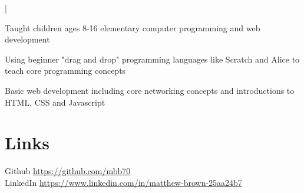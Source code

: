 \documentclass[]{deedy-resume-openfont}
\begin{document}
|
\begin{tightemize}
\item Taught children ages 8-16 elementary computer programming and web development
\item Using beginner "drag and drop" programming languages like Scratch and Alice to teach core programming concepts
\item Basic web development including core networking concepts and introductions to HTML, CSS and Javascript
\end{tightemize}



\section{Links}
Github \href{https://github.com/mbb70}{https://github.com/mbb70} \\
LinkedIn \href{https://www.linkedin.com/in/matthew-brown-25aa24b7}{https://www.linkedin.com/in/matthew-brown-25aa24b7}  \\

\vfill

\end{document}
